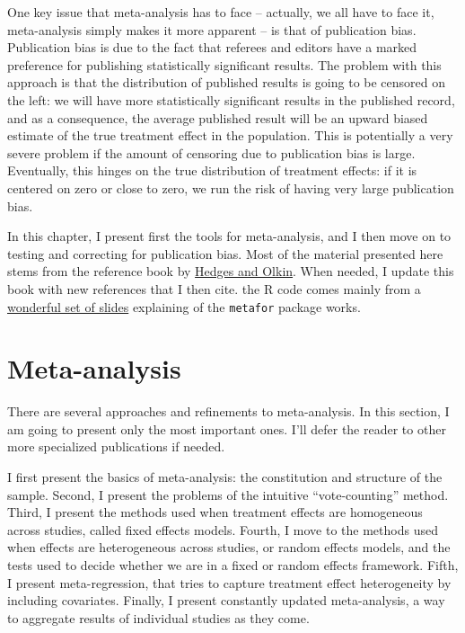 \documentclass[]{book}
\theoremstyle{definition}
\theoremstyle{definition}
\theoremstyle{definition}
\theoremstyle{remark}
\begin{document}
One key issue that meta-analysis has to face -- actually, we all have to face it, meta-analysis simply makes it more apparent -- is that of publication bias.
Publication bias is due to the fact that referees and editors have a marked preference for publishing statistically significant results.
The problem with this approach is that the distribution of published results is going to be censored on the left: we will have more statistically significant results in the published record, and as a consequence, the average published result will be an upward biased estimate of the true treatment effect in the population.
This is potentially a very severe problem if the amount of censoring due to publication bias is large.
Eventually, this hinges on the true distribution of treatment effects: if it is centered on zero or close to zero, we run the risk of having very large publication bias.

In this chapter, I present first the tools for meta-analysis, and I then move on to testing and correcting for publication bias.
Most of the material presented here stems from the reference book by \href{https://www.sciencedirect.com/book/9780080570655/statistical-methods-for-meta-analysis}{Hedges and Olkin}.
When needed, I update this book with new references that I then cite.
the R code comes mainly from a \href{http://www.edii.uclm.es/~useR-2013/Tutorials/kovalchik/kovalchik_meta_tutorial.pdf}{wonderful set of slides} explaining of the \texttt{metafor} package works.

\hypertarget{meta-analysis}{%
\section{Meta-analysis}\label{meta-analysis}}

There are several approaches and refinements to meta-analysis.
In this section, I am going to present only the most important ones.
I'll defer the reader to other more specialized publications if needed.

I first present the basics of meta-analysis: the constitution and structure of the sample.
Second, I present the problems of the intuitive ``vote-counting'' method.
Third, I present the methods used when treatment effects are homogeneous across studies, called fixed effects models.
Fourth, I move to the methods used when effects are heterogeneous across studies, or random effects models, and the tests used to decide whether we are in a fixed or random effects framework.
Fifth, I present meta-regression, that tries to capture treatment effect heterogeneity by including covariates.
Finally, I present constantly updated meta-analysis, a way to aggregate results of individual studies as they come.
\end{document}
